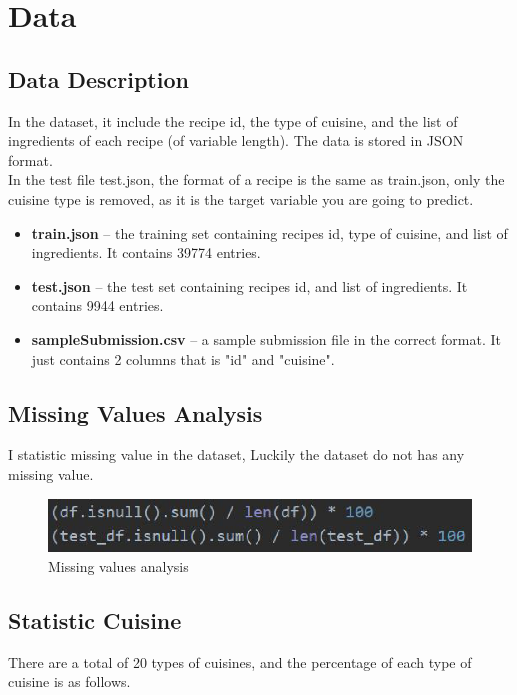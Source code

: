 \documentclass{amsart}
\begin{document}
\section{Data} \label{sec-preliminaries}
\subsection{Data Description}
In the dataset, it include the recipe id, the type of cuisine, and the list of ingredients of each recipe (of variable length). The data is stored in JSON format.\\

In the test file test.json, the format of a recipe is the same as train.json, only the cuisine type is removed, as it is the target variable you are going to predict.\\

\begin{itemize}
	\smallskip
	\item \textbf{train.json} -- the training set containing recipes id, type of cuisine, and list of ingredients. It contains 39774 entries.
	\smallskip
	\item \textbf{test.json} -- the test set containing recipes id, and list of ingredients. It contains 9944 entries.
	\item \textbf{sampleSubmission.csv} -- a sample submission file in the correct format. It just contains 2 columns that is "id" and "cuisine".
\end{itemize}


\subsection{Missing Values Analysis}
I statistic missing value in the dataset, Luckily the dataset do not has any missing value.\\
\begin{figure}[htbp]
	\includegraphics[scale=1]{./figure1/1.eps}
	\caption{Missing values analysis}
\end{figure}

\subsection{Statistic Cuisine}
There are a total of 20 types of cuisines, and the percentage of each type of cuisine is as follows. 
 
\end{document}
